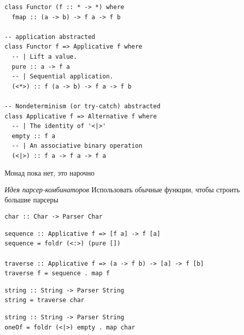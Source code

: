 \documentclass[aspectratio=169
  , xcolor={svgnames}
  , hyperref={ colorlinks,citecolor=Blue
             , linkcolor=DarkRed,urlcolor=DarkBlue}
  , usenames, dvipsnames
  , russian
  ]{beamer}
\begin{document}
\begin{frame}[fragile]
\begin{minipage}{0.65\linewidth}
\begin{verbatim}
class Functor (f :: * -> *) where
  fmap :: (a -> b) -> f a -> f b

-- application abstracted 
class Functor f => Applicative f where
  -- | Lift a value.
  pure :: a -> f a
  -- | Sequential application.
  (<*>) :: f (a -> b) -> f a -> f b

-- Nondeterminism (or try-catch) abstracted
class Applicative f => Alternative f where
  -- | The identity of '<|>'
  empty :: f a
  -- | An associative binary operation
  (<|>) :: f a -> f a -> f a
\end{verbatim}
\end{minipage}\hspace{1cm}
\begin{minipage}{0.2\linewidth}
Монад пока нет, это нарочно
\end{minipage}
\end{frame}


\begin{frame}[fragile]
\begin{block}{\emph{Идея парсер-комбинаторов}}
Использовать обычные функции, чтобы строить большие парсеры
\end{block}
\vspace{1em}

\begin{verbatim}
char :: Char -> Parser Char 
\end{verbatim}
\newln
\begin{verbatim}
sequence :: Applicative f => [f a] -> f [a]
sequence = foldr (<:>) (pure [])

traverse :: Applicative f => (a -> f b) -> [a] -> f [b]
traverse f = sequence . map f  
\end{verbatim}
\newln

\begin{verbatim}
string :: String -> Parser String 
string = traverse char 
\end{verbatim}
\newln
\begin{verbatim}
string :: String -> Parser String 
oneOf = foldr (<|>) empty . map char 
\end{verbatim}
\end{frame}

\end{document}
